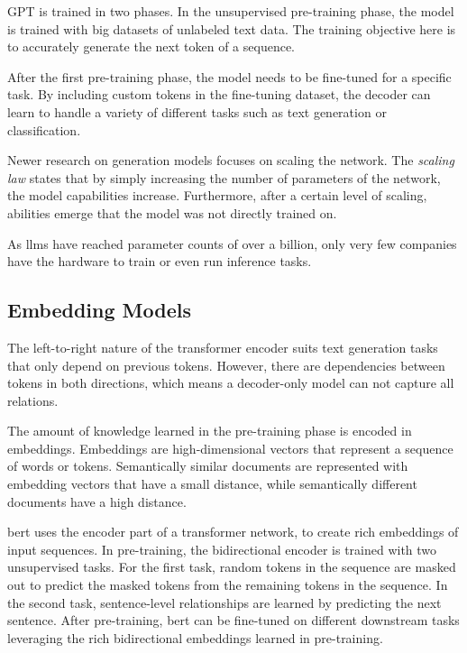 \documentclass[../main.tex]{subfiles}
\begin{document}
GPT is trained in two phases.
In the unsupervised pre-training phase,
the model is trained with big datasets of unlabeled text data.
The training objective here is
to accurately generate the next token of a sequence.

After the first pre-training phase,
the model needs to be fine-tuned for a specific task.
By including custom tokens in the fine-tuning dataset,
the decoder can learn to handle a variety of different tasks
such as text generation or classification.

Newer research on generation models focuses on scaling the network.
The \emph{scaling law} states
that by simply increasing the number of parameters of the network,
the model capabilities increase.
Furthermore,
after a certain level of scaling,
abilities emerge that the model was not directly trained on.

As \glspl{llm} have reached parameter counts of over a billion,
only very few companies have the hardware to train or even run inference tasks.

\subsection{Embedding Models}
\label{subsec:embedding}

The left-to-right nature of the transformer encoder suits text generation tasks that only depend on previous tokens.
However, there are dependencies between tokens in both directions,
which means a decoder-only model can not capture all relations.

The amount of knowledge learned in the pre-training phase is encoded in embeddings.
Embeddings are high-dimensional vectors that represent a sequence of words or tokens.
Semantically similar documents are represented with embedding vectors that have a small distance,
while semantically different documents have a high distance.

\gls{bert}  \cite{Devlin2019} uses the encoder part of a transformer network, to create rich embeddings of input sequences.
In pre-training, the bidirectional encoder is trained with two unsupervised tasks.
For the first task,
random tokens in the sequence are masked out to predict the masked tokens from the remaining tokens in the sequence.
In the second task, sentence-level relationships are learned by predicting the next sentence.
After pre-training,  \gls{bert}  can be fine-tuned on different downstream tasks
leveraging the rich bidirectional embeddings learned in pre-training.
\end{document}
